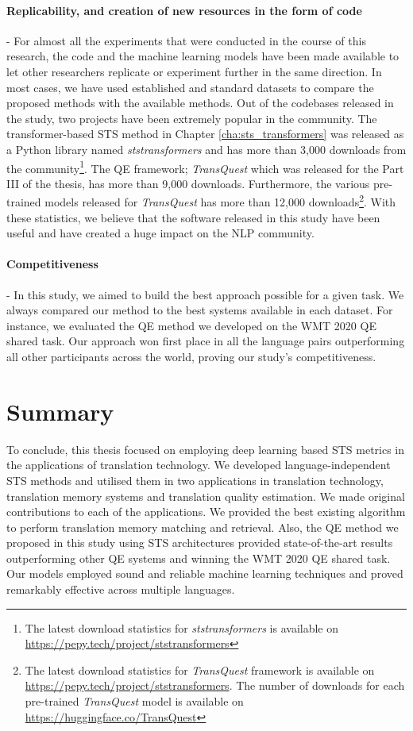 \paragraph{Replicability, and creation of new resources in the form of code} - For almost all the experiments that were conducted in the course of this research, the code and the machine learning models have been made available to let other researchers replicate or experiment further in the same direction. In most cases, we have used established and standard datasets to compare the proposed methods with the available methods. Out of the codebases released in the study, two projects have been extremely popular in the community. The transformer-based STS method in Chapter \ref{cha:sts_transformers} was released as a Python library named \textit{ststransformers} and has more than 3,000 downloads from the community\footnote{The latest download statistics for \textit{ststransformers} is available on \url{https://pepy.tech/project/ststransformers}}. The QE framework; \textit{TransQuest} which was released for the Part III of the thesis, has more than 9,000 downloads. Furthermore, the various pre-trained models released for \textit{TransQuest} has more than 12,000 downloads\footnote{The latest download statistics for \textit{TransQuest} framework is available on \url{https://pepy.tech/project/ststransformers}. The number of downloads for each pre-trained \textit{TransQuest} model is available on \url{https://huggingface.co/TransQuest}}. With these statistics, we believe that the software released in this study have been useful and have created a huge impact on the NLP community.

\paragraph{Competitiveness} - In this study, we aimed to build the best approach possible for a given task. We always compared our method to the best systems available in each dataset. For instance, we evaluated the QE method we developed on the WMT 2020 QE shared task. Our approach won first place in all the language pairs outperforming all other participants across the world, proving our study's competitiveness.



\section{Summary}
To conclude, this thesis focused on employing deep learning based STS metrics in the applications of translation technology. We developed language-independent STS methods and utilised them in two applications in translation technology, translation memory systems and translation quality estimation. We made original contributions to each of the applications. We provided the best existing algorithm to perform translation memory matching and retrieval. Also, the QE method we proposed in this study using STS architectures provided state-of-the-art results outperforming other QE systems and winning the WMT 2020 QE shared task.  Our models employed sound and reliable machine learning techniques and proved remarkably effective across multiple languages.